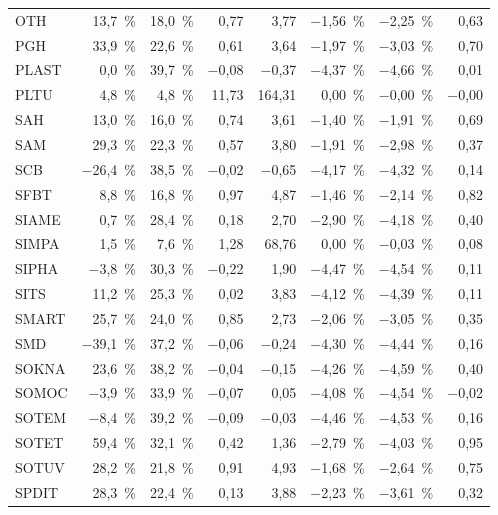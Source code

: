 \documentclass[11pt,a4paper]{article}
\begin{document}
{\begin{longtable}{lrrrrrrr}
OTH & 13{,}7~\% & 18{,}0~\% & 0{,}77 & 3{,}77 & $-$1{,}56~\% & $-$2{,}25~\% & 0{,}63 \\
PGH & 33{,}9~\% & 22{,}6~\% & 0{,}61 & 3{,}64 & $-$1{,}97~\% & $-$3{,}03~\% & 0{,}70 \\
PLAST & 0{,}0~\% & 39{,}7~\% & $-$0{,}08 & $-$0{,}37 & $-$4{,}37~\% & $-$4{,}66~\% & 0{,}01 \\
PLTU & 4{,}8~\% & 4{,}8~\% & 11{,}73 & 164{,}31 & 0{,}00~\% & $-$0{,}00~\% & $-$0{,}00 \\
SAH & 13{,}0~\% & 16{,}0~\% & 0{,}74 & 3{,}61 & $-$1{,}40~\% & $-$1{,}91~\% & 0{,}69 \\
SAM & 29{,}3~\% & 22{,}3~\% & 0{,}57 & 3{,}80 & $-$1{,}91~\% & $-$2{,}98~\% & 0{,}37 \\
SCB & $-$26{,}4~\% & 38{,}5~\% & $-$0{,}02 & $-$0{,}65 & $-$4{,}17~\% & $-$4{,}32~\% & 0{,}14 \\
SFBT & 8{,}8~\% & 16{,}8~\% & 0{,}97 & 4{,}87 & $-$1{,}46~\% & $-$2{,}14~\% & 0{,}82 \\
SIAME & 0{,}7~\% & 28{,}4~\% & 0{,}18 & 2{,}70 & $-$2{,}90~\% & $-$4{,}18~\% & 0{,}40 \\
SIMPA & 1{,}5~\% & 7{,}6~\% & 1{,}28 & 68{,}76 & 0{,}00~\% & $-$0{,}03~\% & 0{,}08 \\
SIPHA & $-$3{,}8~\% & 30{,}3~\% & $-$0{,}22 & 1{,}90 & $-$4{,}47~\% & $-$4{,}54~\% & 0{,}11 \\
SITS & 11{,}2~\% & 25{,}3~\% & 0{,}02 & 3{,}83 & $-$4{,}12~\% & $-$4{,}39~\% & 0{,}11 \\
SMART & 25{,}7~\% & 24{,}0~\% & 0{,}85 & 2{,}73 & $-$2{,}06~\% & $-$3{,}05~\% & 0{,}35 \\
SMD & $-$39{,}1~\% & 37{,}2~\% & $-$0{,}06 & $-$0{,}24 & $-$4{,}30~\% & $-$4{,}44~\% & 0{,}16 \\
SOKNA & 23{,}6~\% & 38{,}2~\% & $-$0{,}04 & $-$0{,}15 & $-$4{,}26~\% & $-$4{,}59~\% & 0{,}40 \\
SOMOC & $-$3{,}9~\% & 33{,}9~\% & $-$0{,}07 & 0{,}05 & $-$4{,}08~\% & $-$4{,}54~\% & $-$0{,}02 \\
SOTEM & $-$8{,}4~\% & 39{,}2~\% & $-$0{,}09 & $-$0{,}03 & $-$4{,}46~\% & $-$4{,}53~\% & 0{,}16 \\
SOTET & 59{,}4~\% & 32{,}1~\% & 0{,}42 & 1{,}36 & $-$2{,}79~\% & $-$4{,}03~\% & 0{,}95 \\
SOTUV & 28{,}2~\% & 21{,}8~\% & 0{,}91 & 4{,}93 & $-$1{,}68~\% & $-$2{,}64~\% & 0{,}75 \\
SPDIT & 28{,}3~\% & 22{,}4~\% & 0{,}13 & 3{,}88 & $-$2{,}23~\% & $-$3{,}61~\% & 0{,}32 \\

\end{longtable}}
\end{document}
